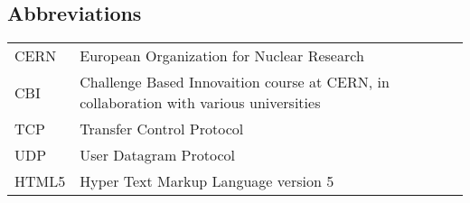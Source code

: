 \documentclass[english,12pt,a4paper,dvips]{article}
\begin{document}


\subsection*{Abbreviations}

\begin{tabular}{ll}
CERN         & European Organization for Nuclear Research \\
CBI      & Challenge Based Innovaition course at CERN, in collaboration with various universities \\
TCP        & Transfer Control Protocol \\ %
UDP        & User Datagram Protocol \\
HTML5       & Hyper Text Markup Language version 5 \\

\end{tabular}


\cleardoublepage
\storeinipagenumber
{}
\setcounter{page}{1}
\end{document}
